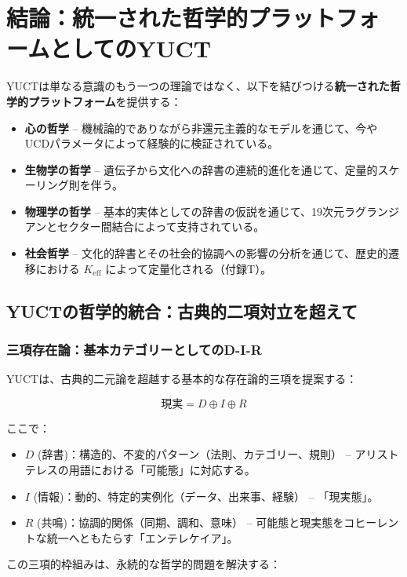 \documentclass[12pt,a4paper]{article}
\newcommand{\eff}{\mathrm{eff}}
\newcommand{\Ke}{K_{\eff}}
\begin{document}
	\section{結論：統一された哲学的プラットフォームとしてのYUCT}
	
	YUCTは単なる意識のもう一つの理論ではなく、以下を結びつける\textbf{統一された哲学的プラットフォーム}を提供する：
	\begin{itemize}
		\item \textbf{心の哲学} – 機械論的でありながら非還元主義的なモデルを通じて、今やUCDパラメータによって経験的に検証されている。
		\item \textbf{生物学の哲学} – 遺伝子から文化への辞書の連続的進化を通じて、定量的スケーリング則を伴う。
		\item \textbf{物理学の哲学} – 基本的実体としての辞書の仮説を通じて、19次元ラグランジアンとセクター間結合によって支持されている。
		\item \textbf{社会哲学} – 文化的辞書とその社会的協調への影響の分析を通じて、歴史的遷移における \(\Ke\) によって定量化される（付録T）。
	\end{itemize}
	
	\subsection{YUCTの哲学的統合：古典的二項対立を超えて}
	
	\subsubsection{三項存在論：基本カテゴリーとしてのD-I-R}
	
	YUCTは、古典的二元論を超越する基本的な存在論的三項を提案する：
	
	\[
	\text{現実} = D \oplus I \oplus R
	\]
	
	ここで：
	\begin{itemize}
		\item $D$ (辞書)：構造的、不変的パターン（法則、カテゴリー、規則） – アリストテレスの用語における「可能態」に対応する。
		\item $I$ (情報)：動的、特定的実例化（データ、出来事、経験） – 「現実態」。
		\item $R$ (共鳴)：協調的関係（同期、調和、意味） – 可能態と現実態をコヒーレントな統一へともたらす「エンテレケイア」。
	\end{itemize}
	
	この三項的枠組みは、永続的な哲学的問題を解決する：
	
\end{document}
